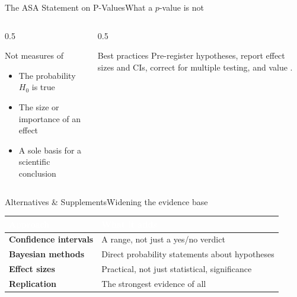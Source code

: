 \documentclass[aspectratio=169,11pt]{beamer}
\begin{document}
\begin{frame}{The ASA Statement on P-Values}{What a $p$-value is not}
  \begin{columns}[T]
    \begin{column}{0.5\textwidth}
      \begin{alertblock}{Not measures of}
        \small
        \begin{itemize}
          \item The probability $H_0$ is true
          \item The size or importance of an effect
          \item A sole basis for a scientific conclusion
        \end{itemize}
      \end{alertblock}
    \end{column}
    \begin{column}{0.5\textwidth}
      \begin{exampleblock}{Best practices}
        \small Pre-register hypotheses, report effect sizes and CIs,
        correct for multiple testing, and value .
      \end{exampleblock}
    \end{column}
  \end{columns}
\end{frame}

\begin{frame}{Alternatives \& Supplements}{Widening the evidence base}
  \small
  \renewcommand{\arraystretch}{1.3}
  \begin{center}
  \begin{tabularx}{\textwidth}{@{}>{\bfseries}l >{\raggedright\arraybackslash}X@{}}
    \toprule
    \rowcolor{PrimaryDark}
    \textcolor{white}{Approach} & \textcolor{white}{What it adds} \\
    \midrule
    Confidence intervals & A range, not just a yes/no verdict \\
    \rowcolor{PrimaryLight!25}
    Bayesian methods & Direct probability statements about hypotheses \\
    Effect sizes & Practical, not just statistical, significance \\
    \rowcolor{PrimaryLight!25}
    Replication & The strongest evidence of all \\
    \bottomrule
  \end{tabularx}
  \end{center}
\end{frame}
\end{document}
